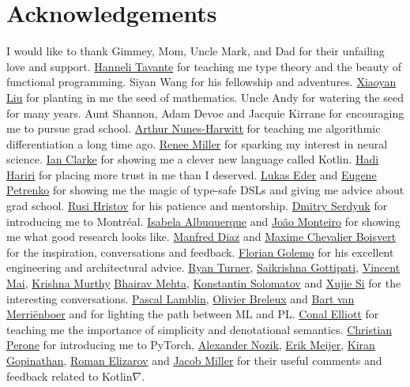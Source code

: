 \documentclass[12pt,initial,twoside,maitrise]{dms}
\numberwithin{equation}{section}
\numberwithin{table}{chapter}
\numberwithin{figure}{chapter}
\begin{document}
\chapter*{Acknowledgements}
\vspace{-60pt} I would like to thank Gimmey, Mom, Uncle Mark, and Dad for their unfailing love and support. \href{http://hannelita.com/}{Hanneli Tavante} for teaching me type theory and the beauty of functional programming. Siyan Wang for his fellowship and adventures. \href{https://laverne.edu/directory/person/xiaoyan-liu/}{Xiaoyan Liu} for planting in me the seed of mathematics. Uncle Andy for watering the seed for many years. Aunt Shannon, Adam Devoe and Jacquie Kirrane for encouraging me to pursue grad school. \href{https://www.cs.rit.edu/~anh/}{Arthur Nunes-Harwitt} for teaching me algorithmic differentiation a long time ago. \href{http://www.sas.rochester.edu/bcs/people/faculty/miller_renee/index.html}{Renee Miller} for sparking my interest in neural science. \href{http://blog.locut.us}{Ian Clarke} for showing me a clever new language called Kotlin. \href{https://hadihariri.com/}{Hadi Hariri} for placing more trust in me than I deserved. \href{http://www.jooq.org/}{Lukas Eder} and \href{https://jonnyzzz.com/}{Eugene Petrenko} for showing me the magic of type-safe DSLs and giving me advice about grad school. \href{https://github.com/rusi}{Rusi Hristov} for his patience and mentorship. \href{https://scholar.google.ca/citations?user=PsKlNzUAAAAJ}{Dmitry Serdyuk} for introducing me to Montr\'eal. \href{https://scholar.google.ca/citations?user=-Ss9QGkAAAAJ}{Isabela Albuquerque} and \href{https://scholar.google.ca/citations?user=hkO47vsAAAAJ}{Jo\~ao Monteiro} for showing me what good research looks like. \href{https://takeitallsource.github.io}{Manfred Diaz} and \href{https://pointersgonewild.com/}{Maxime Chevalier Boisvert} for the inspiration, conversations and feedback. \href{https://fgolemo.github.io/}{Florian Golemo} for his excellent engineering and architectural advice. \href{http://TurnerComputing.com}{Ryan Turner}, \href{https://saikrishna-1996.github.io}{Saikrishna Gottipati}, \href{http://maivincent.github.io}{Vincent Mai}, \href{https://krrish94.github.io/}{Krishna Murthy} \href{https://bhairavmehta95.github.io/}{Bhairav Mehta}, \href{http://www.solomatov.me/}{Konstantin Solomatov} and \href{https://www.seas.upenn.edu/~xsi/}{Xujie Si} for the interesting conversations. \href{https://scholar.google.ca/citations?user=bn4xHHIAAAAJ}{Pascal Lamblin}, \href{http://breuleux.net}{Olivier Breleux} and \href{https://scholar.google.ca/citations?user=XE9SDzgAAAAJ}{Bart van Merri\"enboer} and for lighting the path between ML and PL. \href{http://conal.net/}{Conal Elliott} for teaching me the importance of simplicity and denotational semantics. \href{http://christianperone.com}{Christian Perone} for introducing me to PyTorch, \href{https://research.jetbrains.org/researchers/altavir}{Alexander Nozik}, \href{https://twitter.com/headinthebox}{Erik Meijer}, \href{https://scholar.google.com/citations?user=IcuGXgcAAAAJ}{Kiran Gopinathan}, \href{https://medium.com/@elizarov}{Roman Elizarov} and \href{https://cquic.unm.edu/member/jacob.miller/}{Jacob Miller} for their useful comments and feedback related to Kotlin$\nabla$. 
\end{document}
